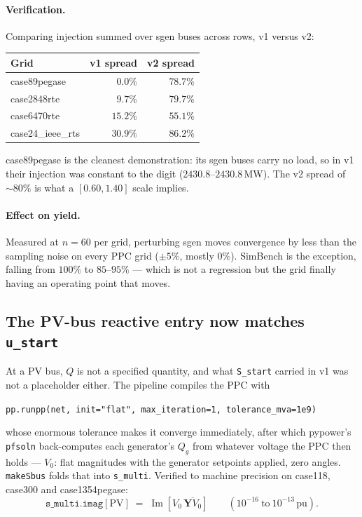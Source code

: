 \documentclass{article}
\newcommand{\dok}[1]{\textcolor{good}{#1}}
\newcommand{\dbad}[1]{\textcolor{bad}{#1}}
\newcommand{\pu}{\,\text{pu}}
\begin{document}
\paragraph{Verification.}  Comparing injection summed over sgen buses across
rows, v1 versus v2:

\begin{center}
\begin{tabular}{lrr}
\toprule
\textbf{Grid} & \textbf{v1 spread} & \textbf{v2 spread} \\
\midrule
case89pegase    & \dbad{$0.0\%$} & \dok{$78.7\%$} \\
case2848rte     & $9.7\%$        & \dok{$79.7\%$} \\
case6470rte     & $15.2\%$       & \dok{$55.1\%$} \\
case24\_ieee\_rts & $30.9\%$     & \dok{$86.2\%$} \\
\bottomrule
\end{tabular}
\end{center}

\noindent
case89pegase is the cleanest demonstration: its sgen buses carry no load, so in
v1 their injection was constant to the digit ($2430.8$--$2430.8$\,MW).  The v2
spread of $\sim\!80\%$ is what a $[0.60, 1.40]$ scale implies.

\paragraph{Effect on yield.}  Measured at $n{=}60$ per grid, perturbing sgen
moves convergence by less than the sampling noise on every PPC grid
($\pm5\%$, mostly $0\%$).  SimBench is the exception, falling from $100\%$ to
$85$--$95\%$ --- which is not a regression but the grid finally having an
operating point that moves.

\subsection{The PV-bus reactive entry now matches \texttt{u\_start}}
\label{sec:pvq}

At a PV bus, $Q$ is not a specified quantity, and what \texttt{S\_start} carried
in v1 was not a placeholder either.  The pipeline compiles the PPC with

\begin{center}
\texttt{pp.runpp(net, init="flat", max\_iteration=1, tolerance\_mva=1e9)}
\end{center}

\noindent
whose enormous tolerance makes it converge immediately, after which pypower's
\texttt{pfsoln} back-computes each generator's $Q_g$ from whatever voltage the
PPC then holds --- $V_0$: flat magnitudes with the generator setpoints applied,
zero angles.  \texttt{makeSbus} folds that into \texttt{s\_multi}.  Verified to
machine precision on case118, case300 and case1354pegase:
\[
\texttt{s\_multi.imag}[\text{PV}] \;=\; \operatorname{Im}\!\left[V_0 \,
\overline{\mathbf{Y}V_0}\right]
\qquad (10^{-16}\ \text{to}\ 10^{-13}\pu).
\]
\end{document}
